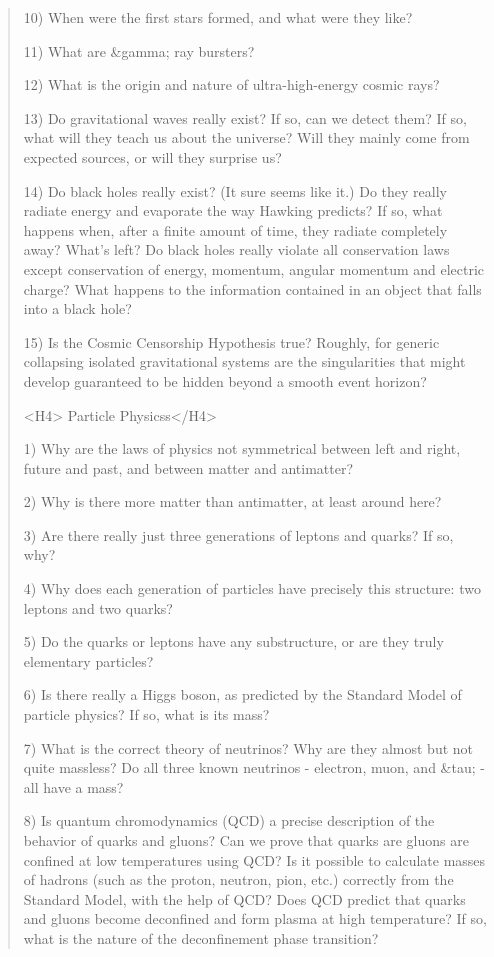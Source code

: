 \begin{quote}
 10) When were the first stars formed, and what were they like?

 11) What are &gamma; ray bursters?

 12) What is the origin and nature of ultra-high-energy cosmic rays?

 13) Do gravitational waves really exist?  If so, can we detect them?  
     If so, what will they teach us about the universe?  Will they 
     mainly come from expected sources, or will they surprise us?

 14) Do black holes really exist?  (It sure seems like it.)
     Do they really radiate energy and evaporate the way Hawking 
     predicts?  If so, what happens when, after a finite amount of 
     time, they radiate completely away?  What's left?  Do black holes 
     really violate all conservation laws except conservation of 
     energy, momentum, angular momentum and electric charge?  What 
     happens to the information contained in an object that falls 
     into a black hole?

 15) Is the Cosmic Censorship Hypothesis true?  Roughly, for generic 
     collapsing isolated gravitational systems are the singularities 
     that might develop guaranteed to be hidden beyond a smooth event 
     horizon?

<H4> Particle Physicss</H4>

 1) Why are the laws of physics not symmetrical between left and 
    right, future and past, and between matter and antimatter?

 2) Why is there more matter than antimatter, at least around here?

 3) Are there really just three generations of leptons and quarks? 
    If so, why?

 4) Why does each generation of particles have precisely this 
    structure: two leptons and two quarks?   

 5) Do the quarks or leptons have any substructure, or are they
    truly elementary particles?

 6) Is there really a Higgs boson, as predicted by the Standard Model 
    of particle physics?   If so, what is its mass? 

 7) What is the correct theory of neutrinos?  Why are they almost but
    not quite massless?  Do all three known neutrinos - electron, muon,
    and &tau; - all have a mass? 

 8) Is quantum chromodynamics (QCD) a precise description of the 
    behavior of quarks and gluons?  Can we prove that quarks are 
    gluons are confined at low temperatures using QCD?  Is it possible 
    to calculate masses of hadrons (such as the proton, neutron, pion, 
    etc.) correctly from the Standard Model, with the help of QCD? 
    Does QCD predict that quarks and gluons become deconfined and form
    plasma at high temperature?  If so, what is the nature of the 
    deconfinement phase transition?
  

\end{quote}
